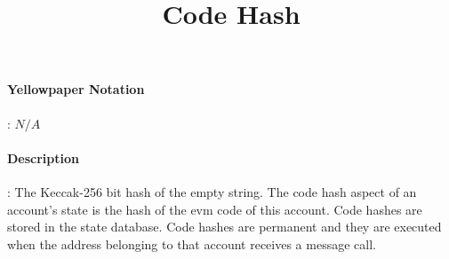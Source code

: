 \documentclass[10pt,a4paper,oneside]{scrartcl}
\title{Code Hash}
\date{}
\begin{document}
\maketitle
\paragraph{Yellowpaper Notation}: $N/A$
\paragraph{Description}: The Keccak-256 bit hash of the empty string. The code hash aspect of an account’s state is the hash of the evm code of this account. Code hashes are stored in the state database. Code hashes are permanent and they are executed when the address belonging to that account receives a message call. 
\end{document}

